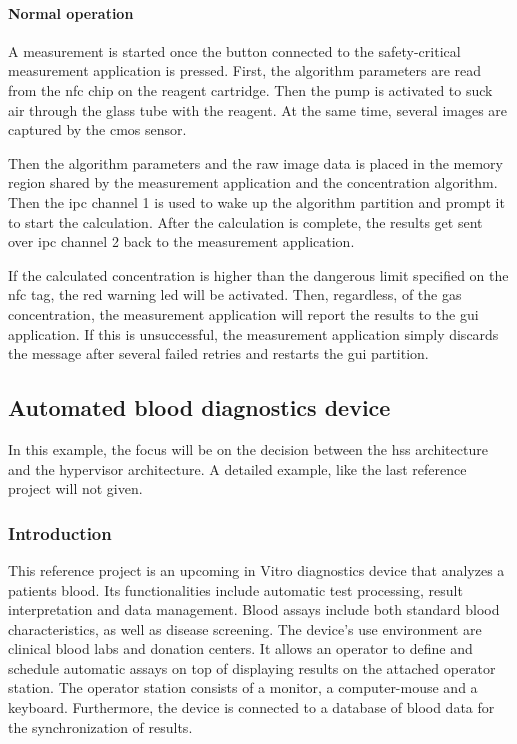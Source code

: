 \paragraph{Normal operation}
A measurement is started once the button connected to the safety-critical measurement application is pressed. First, the algorithm parameters are read from the \acrshort{nfc} chip on the reagent cartridge. Then the pump is activated to suck air through the glass tube with the reagent. At the same time, several images are captured by the \acrshort{cmos} sensor.

Then the algorithm parameters and the raw image data is placed in the memory region shared by the measurement application and the concentration algorithm. Then the \acrshort{ipc} channel 1 is used to wake up the algorithm partition and prompt it to start the calculation. After the calculation is complete, the results get sent over \acrshort{ipc} channel 2 back to the measurement application. 

If the calculated concentration is higher than the dangerous limit specified on the \acrshort{nfc} tag, the red warning \acrshort{led} will be activated. Then, regardless, of the gas concentration, the measurement application will report the results to the \acrshort{gui} application. If this is unsuccessful, the measurement application simply discards the message after several failed retries and restarts the \acrshort{gui} partition.

\subsection{Automated blood diagnostics device}
In this example, the focus will be on the decision between the \acrshort{hss} architecture and the hypervisor architecture. A detailed example, like the last reference project will not given.
\subsubsection{Introduction}
This reference project is an upcoming in Vitro diagnostics device that analyzes a patients blood. Its functionalities include automatic test processing, result interpretation and data management. Blood assays include both standard blood characteristics, as well as disease screening.
The device's use environment are clinical blood labs and donation centers. It allows an operator to define and schedule automatic assays on top of displaying results on the attached operator station. The operator station consists of a monitor, a computer-mouse and a keyboard. Furthermore, the device is connected to a database of blood data for the synchronization of results.

